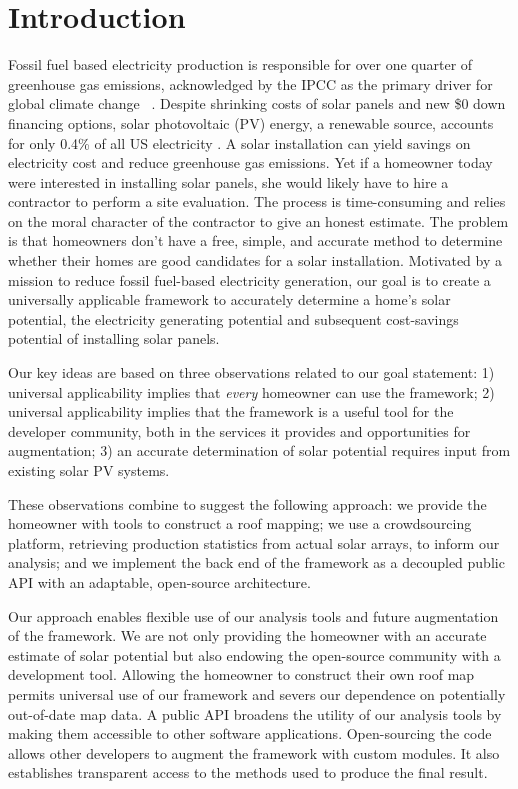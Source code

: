 \documentclass[pageno]{jpaper}
\begin{document}
\section{Introduction}  
Fossil fuel based electricity production is responsible for over one quarter of greenhouse gas emissions, acknowledged by the IPCC as the primary driver for global climate change ~\cite{IPCC}. Despite shrinking costs of solar panels and new \$0 down financing options, solar photovoltaic (PV) energy, a renewable source, accounts for only 0.4\% of all US electricity \cite{USEIA}. A solar installation can yield savings on electricity cost and reduce greenhouse gas emissions. Yet if a homeowner today were interested in installing solar panels, she would likely have to hire a contractor to perform a site evaluation. The process is time-consuming and relies on the moral character of the contractor to give an honest estimate. The problem is that homeowners don't have a free, simple, and accurate method to determine whether their homes are good candidates for a solar installation. Motivated by a mission to reduce fossil fuel-based electricity generation, our goal is to create a universally applicable framework to accurately determine a home's solar potential, the electricity generating potential and subsequent cost-savings potential of installing solar panels.

Our key ideas are based on three observations related to our goal statement: 1) universal applicability implies that {\em every} homeowner can use the framework; 2) universal applicability implies that the framework is a useful tool for the developer community, both in the services it provides and opportunities for augmentation; 3) an accurate determination of solar potential requires input from existing solar PV systems.

These observations combine to suggest the following approach: we provide the homeowner with tools to construct a roof mapping; we use a crowdsourcing platform, retrieving production statistics from actual solar arrays, to inform our analysis; and we implement the back end of the framework as a decoupled public API with an adaptable, open-source architecture.

Our approach enables flexible use of our analysis tools and future augmentation of the framework. We are not only providing the homeowner with an accurate estimate of solar potential but also endowing the open-source community with a development tool. Allowing the homeowner to construct their own roof map permits universal use of our framework and severs our dependence on potentially out-of-date map data. A public API broadens the utility of our analysis tools by making them accessible to other software applications. Open-sourcing the code allows other developers to augment the framework with custom modules. It also establishes transparent access to the methods used to produce the final result.
\end{document}
